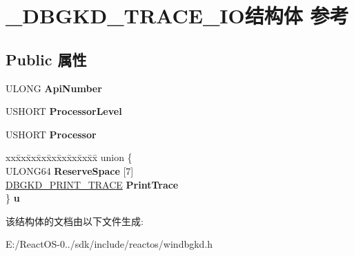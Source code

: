 \hypertarget{struct___d_b_g_k_d___t_r_a_c_e___i_o}{}\section{\+\_\+\+D\+B\+G\+K\+D\+\_\+\+T\+R\+A\+C\+E\+\_\+\+I\+O结构体 参考}
\label{struct___d_b_g_k_d___t_r_a_c_e___i_o}
\subsection*{Public 属性}
\begin{DoxyCompactItemize}
\item 
\mbox{\label{struct___d_b_g_k_d___t_r_a_c_e___i_o_a1ca0c195fda99b8f1403dbb21576f1ee}} 
U\+L\+O\+NG {\bfseries Api\+Number}
\item 
\mbox{\label{struct___d_b_g_k_d___t_r_a_c_e___i_o_a47b99a84ed0f1c4387071d8ace29cc4a}} 
U\+S\+H\+O\+RT {\bfseries Processor\+Level}
\item 
\mbox{\label{struct___d_b_g_k_d___t_r_a_c_e___i_o_a1727caa1a3f1f60263ddd3e83aaf97e2}} 
U\+S\+H\+O\+RT {\bfseries Processor}
\item 
\mbox{\label{struct___d_b_g_k_d___t_r_a_c_e___i_o_a943637c8261078985db926e7f2d7e882}} 
\begin{tabbing}
xx\=xx\=xx\=xx\=xx\=xx\=xx\=xx\=xx\=\kill
union \{\\
\>ULONG64 {\bfseries ReserveSpace} \mbox{[}7\mbox{]}\\
\>\hyperlink{struct___d_b_g_k_d___p_r_i_n_t___t_r_a_c_e}{DBGKD\_PRINT\_TRACE} {\bfseries PrintTrace}\\
\} {\bfseries u}\\

\end{tabbing}\end{DoxyCompactItemize}


该结构体的文档由以下文件生成\+:\begin{DoxyCompactItemize}
\item 
E\+:/\+React\+O\+S-\/0../sdk/include/reactos/windbgkd.\+h\end{DoxyCompactItemize}
